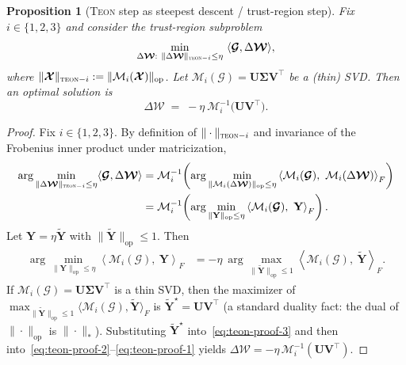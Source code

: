 \documentclass{article}
\newcommand{\ten}[1]{\bm{\mathcal{#1}}}
\newcommand{\mat}[1]{\mathbf{#1}}
\theoremstyle{plain}
\newtheorem{proposition}[theorem]{Proposition}
\theoremstyle{definition}
\theoremstyle{remark}
\begin{document}
\begin{proposition}[\textsc{Teon} step as steepest descent / trust-region step]
\label{prop:teon-steepest}
Fix $i\in\{1,2,3\}$ and consider the trust-region subproblem
\begin{equation}
\label{eq:ntr-linear-teon}
\min_{\Delta \ten{W}:\ \|\Delta \ten{W}\|_{\textsc{teon}-i}\le \eta}
\ \langle \ten{G},\Delta \ten{W} \rangle,
\end{equation}
where $\|\ten{X}\|_{\textsc{teon}-i}:=\|\mathcal{M}_i(\ten{X})\|_{\mathrm{op}}$.
Let $\mathcal{M}_i(\ten{G})=\mat{U}\mat{\Sigma} \mat{V}^\top$ be a (thin) SVD. Then an optimal solution is
\begin{equation}
\label{eq:teon-steepest-solution}
\Delta \ten{W}
\;=\;
-\eta\ \mathcal{M}_i^{-1}\!\big(\mat{U}\mat{V}^\top\big).
\end{equation}
\end{proposition}

\begin{proof}
Fix $i\in\{1,2,3\}$. By definition of $\|\cdot\|_{\textsc{teon}-i}$ and invariance of the Frobenius inner product under matricization,
\begin{align}
\arg\min_{\|\Delta \ten{W}\|_{\textsc{teon}-i}\le \eta}
\langle \ten{G},\Delta \ten{W}\rangle
&=
\mathcal{M}_i^{-1}\!\left(
\arg\min_{\|\mathcal{M}_i(\Delta \ten{W})\|_{\mathrm{op}}\le \eta}
\left\langle \mathcal{M}_i(\ten{G}),\ \mathcal{M}_i(\Delta \ten{W}) \right\rangle_F
\right)
\label{eq:teon-proof-1}
\\
&=
\mathcal{M}_i^{-1}\!\left(
\arg\min_{\|\mat{Y}\|_{\mathrm{op}}\le \eta}
\left\langle \mathcal{M}_i(\ten{G}),\ \mat{Y} \right\rangle_F
\right).
\label{eq:teon-proof-2}
\end{align}
Let $\mat{Y}=\eta \tilde{\mat{Y}}$ with $\|\tilde{\mat{Y}}\|_{\mathrm{op}}\le 1$. Then
\begin{align}
\arg\min_{\|\mat{Y}\|_{\mathrm{op}}\le \eta}
\left\langle \mathcal{M}_i(\ten{G}),\ \mat{Y} \right\rangle_F
&=
-\eta\ \arg\max_{\|\tilde{\mat{Y}}\|_{\mathrm{op}}\le 1}
\left\langle \mathcal{M}_i(\ten{G}),\ \tilde{\mat{Y}} \right\rangle_F.
\label{eq:teon-proof-3}
\end{align}
If $\mathcal{M}_i(\ten{G})=\mat{U}\mat{\Sigma} \mat{V}^\top$ is a thin SVD, then the maximizer of
$\max_{\|\tilde{\mat{Y}}\|_{\mathrm{op}}\le 1}\langle \mathcal{M}_i(\ten{G}),\tilde{\mat{Y}}\rangle_F$
is $\tilde{\mat{Y}}^\star=\mat{U}\mat{V}^\top$ (a standard duality fact: the dual of $\|\cdot\|_{\mathrm{op}}$ is $\|\cdot\|_*$).
Substituting $\tilde{\mat{Y}}^\star$ into~\eqref{eq:teon-proof-3} and then into~\eqref{eq:teon-proof-2}--\eqref{eq:teon-proof-1} yields
$\Delta \ten{W}=-\eta\,\mathcal{M}_i^{-1}(\mat{U}\mat{V}^\top)$.
\end{proof}
\end{document}
